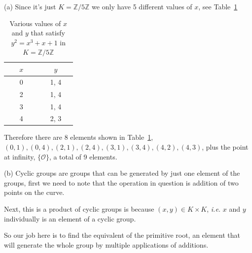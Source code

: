\documentclass[aps,preprint,preprintnumbers,nofootinbib,showpacs,prd]{revtex4-1}
\newcommand{\ie}{{\it i.e.} }
\begin{document}
(a) Since it's just $K = \mathbb{Z}/5\mathbb{Z}$ we only have 5 different values of $x$, see Table~\ref{Tab:8}
%
\begin{table}[]
\centering
\caption{Various values of $x$ and $y$ that satisfy $y^2 = x^3 + x + 1$ in $K = \mathbb{Z}/5\mathbb{Z}$}
\label{Tab:8}
\begin{tabular}{|c|c|}
\hline
~~~$x$~~~ & ~~~$y$~~~ \\ \hline
0 & 1, 4 \\ \hline
2 & 1, 4 \\ \hline
3 & 1, 4 \\ \hline
4 & 2, 3 \\ \hline
\end{tabular}
\end{table}
%
Therefore there are 8 elements shown in Table~\ref{Tab:8}, $(0,1),(0,4),(2,1),(2,4),(3,1),(3,4),(4,2),(4,3)$, plus the point at infinity, $\{\mathcal{O}\}$, a total of 9 elements.

(b) Cyclic groups are groups that can be generated by just one element of the groups, first we need to note that the operation in question is addition of two points on the curve.

Next, this is a product of cyclic groups is because $(x,y) \in K \times K$, \ie $x$ and $y$ individually is an element of a cyclic group.

So our job here is to find the equivalent of the primitive root, an element that will generate the whole group by multiple applications of additions.
\end{document}
